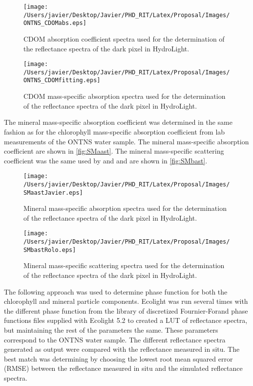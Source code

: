 \begin{figure}[!ht]
  	\centering
  	\texttt{[image: /Users/javier/Desktop/Javier/PHD\_RIT/Latex/Proposal/Images/ONTNS\_CDOMabs.eps]}
  \caption{CDOM absorption coefficient spectra used for the determination of the reflectance spectra of the dark pixel in HydroLight. \label{fig:CDOMa} } 
\end{figure}

\begin{figure}[!ht]
  	\centering
  	\texttt{[image: /Users/javier/Desktop/Javier/PHD\_RIT/Latex/Proposal/Images/ONTNS\_CDOMfitting.eps]}
  \caption{CDOM mass-specific absorption spectra used for the determination of the reflectance spectra of the dark pixel in HydroLight. \label{fig:CDOMaast} }
\end{figure}

The mineral mass-specific absorption coefficient was determined in the same fashion as for the chlorophyll mass-specific absorption coefficient from lab measurements of the ONTNS water sample. The mineral mass-specific absorption coefficient are shown in \autoref{fig:SMaast}. The mineral mass-specific scattering coefficient was the same used by \cite{Raqueno:2000} and \cite{Raqueno:2003} and are shown in \autoref{fig:SMbast}.

\begin{figure}[!ht]
  	\centering
  	\texttt{[image: /Users/javier/Desktop/Javier/PHD\_RIT/Latex/Proposal/Images/SMaastJavier.eps]}
  \caption{Mineral mass-specific absorption spectra used for the determination of the reflectance spectra of the dark pixel in HydroLight. \label{fig:SMaast} } 
\end{figure}

\begin{figure}[!ht]
  	\centering
  	\texttt{[image: /Users/javier/Desktop/Javier/PHD\_RIT/Latex/Proposal/Images/SMbastRolo.eps]}
  \caption{Mineral mass-specific scattering spectra used for the determination of the reflectance spectra of the dark pixel in HydroLight. \label{fig:SMbast} } 
\end{figure}

The following approach was used to determine phase function for both the chlorophyll and mineral particle components. Ecolight was run several times with the different phase function from the library of discretized Fournier-Forand phase functions files supplied with Ecolight 5.2 to created a LUT of reflectance spectra, but maintaining the rest of the parameters the same. These parameters correspond to the ONTNS water sample. The different reflectance spectra generated as output were compared with the reflectance measured in situ. The best match was determining by choosing the lowest root mean squared error (RMSE) between the reflectance measured in situ and the simulated reflectance spectra.

